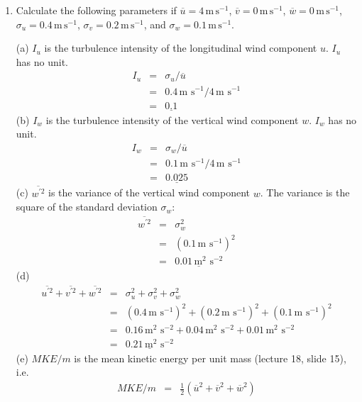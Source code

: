 \documentclass[11pt]{article}
\begin{document}
\begin{enumerate}
\item Calculate the following parameters if $\overline{u} = 4\, \textrm{m}\, \textrm{s}^{-1}$, $\overline{v} = 0\, \textrm{m}\, \textrm{s}^{-1}$, $\overline{w} = 0\, \textrm{m}\, \textrm{s}^{-1}$, $\sigma_u = 0.4\, \textrm{m}\, \textrm{s}^{-1}$, $\sigma_v = 0.2\, \textrm{m}\, \textrm{s}^{-1}$, and $\sigma_w = 0.1\, \textrm{m}\, \textrm{s}^{-1}$.

(a) $I_u$ is the turbulence intensity of the longitudinal wind component $u$. $I_u$ has no unit.
\begin{eqnarray*}
I_u &=& \sigma_u / \overline{u} \\
&=& 0.4\,\textrm{m}\,\, \textrm{s}^{-1} / 4 \,\textrm{m}\,\, \textrm{s}^{-1} \\
&=& \underline{0.1}
\end{eqnarray*}
(b) $I_w$ is the turbulence intensity of the vertical wind component $w$. $I_w$ has no unit.
\begin{eqnarray*}
I_w &=& \sigma_w / \overline{u} \\
&=& 0.1\,\textrm{m}\,\, \textrm{s}^{-1} / 4 \,\textrm{m}\,\, \textrm{s}^{-1} \\
&=& \underline{0.025}
\end{eqnarray*}
(c) $\overline{w^{\prime 2}}$ is the variance of the vertical wind component $w$. The variance is the square of the standard deviation $\sigma_w$:
\begin{eqnarray*}
\overline{w^{\prime 2}} &=& \sigma_w^2  \\
&=& (0.1 \,\textrm{m}\,\, \textrm{s}^{-1})^2 \\
&=& \underline{0.01 \,\textrm{m}^2\,\, \textrm{s}^{-2}}
\end{eqnarray*}
(d) 
\begin{eqnarray*}
\overline{u^{\prime 2}} + \overline{v^{\prime 2}} + \overline{w^{\prime 2}} &=& \sigma_u^2 + \sigma_v^2 + \sigma_w^2  \\
&=& (0.4 \,\textrm{m}\,\, \textrm{s}^{-1})^2 + (0.2 \,\textrm{m}\,\, \textrm{s}^{-1})^2 + (0.1 \,\textrm{m}\,\, \textrm{s}^{-1})^2 \\
&=& 0.16 \,\textrm{m}^2\,\, \textrm{s}^{-2} + 0.04 \,\textrm{m}^2\,\, \textrm{s}^{-2} + 0.01 \,\textrm{m}^2\,\, \textrm{s}^{-2} \\
&=& \underline{0.21\, \textrm{m}^2\,\, \textrm{s}^{-2}}
\end{eqnarray*}
(e) $MKE / m$ is the mean kinetic energy per unit mass (lecture 18, slide 15), i.e.
\begin{eqnarray*}
MKE / m &=& \frac{1}{2}(\overline{u}^2+\overline{v}^2+\overline{w}^2)\\

\end{eqnarray*}
\end{enumerate}
\end{document}
